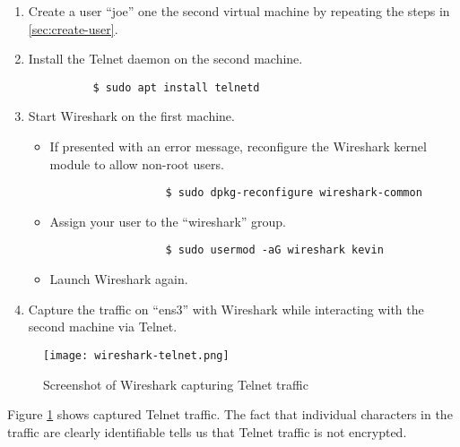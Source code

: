 \begin{enumerate}
  \item Create a user \enquote{joe} one the second virtual machine by repeating the steps in \ref{sec:create-user}.
  \item Install the Telnet daemon on the second machine.
        \begin{verbatim}
          $ sudo apt install telnetd
        \end{verbatim}
  \item Start Wireshark on the first machine.

        \begin{itemize}
          \item If presented with an error message, reconfigure the Wireshark kernel module to allow non-root users.

                \begin{verbatim}
                  $ sudo dpkg-reconfigure wireshark-common
                \end{verbatim}

          \item Assign your user to the \enquote{wireshark} group.

                \begin{verbatim}
                  $ sudo usermod -aG wireshark kevin
                \end{verbatim}

          \item Launch Wireshark again.
        \end{itemize}

  \item Capture the traffic on \enquote{ens3} with Wireshark while interacting with the second machine via Telnet.
\end{enumerate}

\begin{figure}[H]
  \centering
  \texttt{[image: wireshark-telnet.png]}
  \caption{Screenshot of Wireshark capturing Telnet traffic}
  \label{fig:wireshark}
\end{figure}

Figure \ref{fig:wireshark} shows captured Telnet traffic.
The fact that individual characters in the traffic are clearly identifiable tells us that Telnet traffic is not encrypted.

